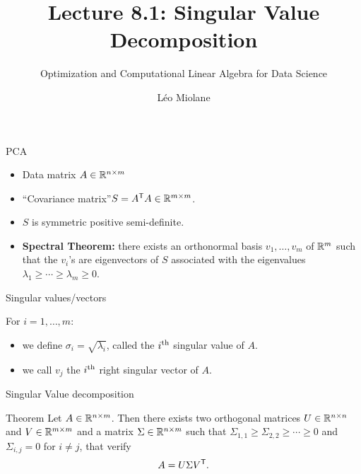 \documentclass{beamer}
\title{Lecture 8.1: Singular Value Decomposition}
\subtitle{Optimization and Computational Linear Algebra for Data Science}
\author{Léo Miolane}
\date{}
\begin{document}
\setcounter{showProgressBar}{0}
\setcounter{showSlideNumbers}{0}

\frame{\titlepage}
\setcounter{framenumber}{0}
\setcounter{showSlideNumbers}{1}



\begin{frame}[t]{PCA}
	\grid
	
	\begin{itemize}
		\item Data matrix \quad $A \in \mathbb{R}^{n \times m}$
			\vspace{1mm}
		\item ``Covariance matrix''\quad $S = A^{{\sf T}} A \in \mathbb{R}^{m \times m}$.
			\vspace{1mm}
		\item $S$ is symmetric positive semi-definite.
			\vspace{1mm}
		\item \textbf{Spectral Theorem:} there exists an orthonormal basis $v_1, \dots, v_m$ of $\mathbb{R}^m$ such that the $v_i$'s are eigenvectors of $S$ associated with the eigenvalues $\lambda_1 \geq \cdots \geq \lambda_m \geq 0$.
	\end{itemize}

\end{frame}

\begin{frame}[t]{Singular values/vectors}
	\grid

	For $i=1, \dots, m$:
	\begin{itemize}
		\item we define $\sigma_i = \sqrt{\lambda_i}$, called the $i^{\rm th}$ singular value of $A$.
		\item we call $v_j$ the $i^{\rm th}$ right singular vector of $A$.
	\end{itemize}

\end{frame}
\begin{frame}[t]{Singular Value decomposition}
	\grid

	\vspace{-0.3cm}
	\begin{block}{Theorem}
		Let $A \in \mathbb{R}^{n \times m}$. Then there exists two orthogonal matrices $U \in \mathbb{R}^{n \times n}$ and $V \in \mathbb{R}^{m \times m}$ and a matrix $\Sigma \in \mathbb{R}^{n \times m}$ such that $\Sigma_{1,1} \geq \Sigma_{2,2}  \geq \cdots \geq 0$ and $\Sigma_{i,j} = 0$ for $i\neq j$, that verify
		$$
		A = U \Sigma V^{{\sf T}}.
		$$
	\end{block}

\end{frame}
\end{document}
